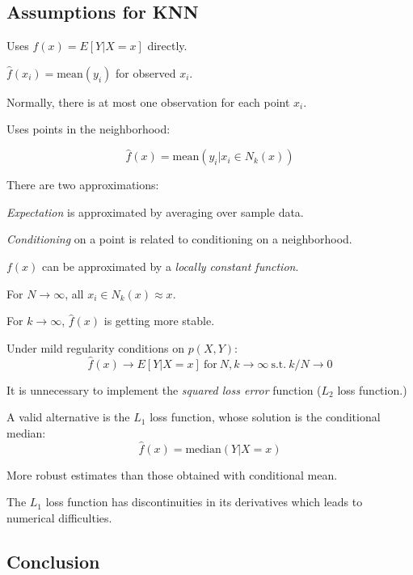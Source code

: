 \documentclass[twoside,twocolumn,10pt]{revtex4-1}
\newcommand{\SubItem}[1]{
    {\setlength\itemindent{15pt} \item[-] #1}
}
\begin{document}
	\subsection{Assumptions for KNN}
	
	\begin{itemize}
	\item Uses $f(x) = E[Y|X = x]$ directly.
	\item $\hat{f}(x_i) = \text{mean}(y_i)$ for observed $x_i$.
	\item Normally, there is at most one observation for each point $x_i$.
	\item Uses points in the neighborhood:
	
		\begin{equation*}
		\hat{f}(x) = \text{mean}(y_i | x_i \in N_k(x))
		\end{equation*}

	\item There are two approximations:
	\SubItem{\textit{Expectation} is approximated by averaging over sample data.}
	\SubItem{\textit{Conditioning} on a point is related to conditioning on a neighborhood.}
	\item $f(x)$ can be approximated by a \textit{locally constant function}.
	\item For $N \to \infty$, all $x_i \in N_k(x) \approx x$.
	\item For $k \to \infty$, $\hat{f}(x)$ is getting more stable.
	\item Under mild regularity conditions on $p(X,Y)$:
		\begin{equation*}
		\hat{f}(x) \to E[Y|X = x] \ \text{for} \ N, k \to \infty \ \text{s.t.} \ k/N \to 0
		\end{equation*}		
	\item It is unnecessary to implement the \textit{squared loss error} function ($L_2$ loss function.)
	\item A valid alternative is the $L_1$ loss function, whose solution is the conditional median:
		\begin{equation}
		\hat{f}(x) = \text{median}(Y|X=x)
		\end{equation}
	\item More robust estimates than those obtained with conditional mean.
	\item The $L_1$ loss function has discontinuities in its derivatives which leads to numerical difficulties.
	\end{itemize}
	
	\subsection{Conclusion}
	
\end{document}
